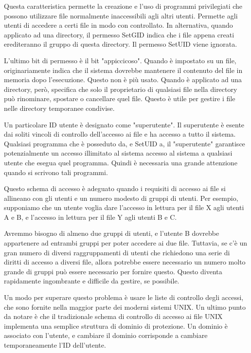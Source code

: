 \singlespacing

Questa caratteristica permette la creazione e l'uso di programmi privilegiati che possono utilizzare file normalmente inaccessibili agli altri utenti. Permette agli utenti di accedere a certi file in modo con controllato. In alternativa, quando applicato ad una directory, il permesso SetGID indica che i file appena creati erediteranno il gruppo di questa directory. Il permesso SetUID viene ignorata.

\singlespacing

L'ultimo bit di permesso è il bit "appiccicoso". Quando è impostato su un file, originariamente indica che il sistema dovrebbe mantenere il contenuto del file in memoria dopo l'esecuzione. Questo non è più usato. Quando è applicato ad una directory, però, specifica che solo il proprietario di qualsiasi file nella directory può rinominare, spostare o cancellare quel file. Questo è utile per gestire i file nelle directory temporanee condivise.

\singlespacing

Un particolare ID utente è designato come "superutente". Il superutente è esente dai soliti vincoli di controllo dell'accesso ai file e ha accesso a tutto il sistema. Qualsiasi programma che è posseduto da, e SetUID a, il "superutente" garantisce potenzialmente un accesso illimitato al sistema accesso al sistema a qualsiasi utente che esegua quel programma. Quindi è necessaria una grande attenzione quando si scrivono tali programmi.

\singlespacing

Questo schema di accesso è adeguato quando i requisiti di accesso ai file si allineano con gli utenti e un numero modesto di gruppi di utenti. Per esempio, supponiamo che un utente voglia dare l'accesso in lettura per il file X agli utenti A e B, e l'accesso in lettura per il file Y agli utenti B e C.

\singlespacing

Avremmo bisogno di almeno due gruppi di utenti, e l'utente B dovrebbe appartenere ad entrambi gruppi per poter accedere ai due file. Tuttavia, se c'è un gran numero di diversi raggruppamenti di utenti che richiedono una serie di diritti di accesso a diversi file, allora potrebbe essere necessario un numero molto grande di gruppi può essere necessario per fornire questo. Questo diventa rapidamente ingombrante e difficile da gestire, se possibile.

\singlespacing

Un modo per superare questo problema è usare le liste di controllo degli accessi, che sono fornite nella maggior parte dei moderni sistemi UNIX. Un ultimo punto da notare è che il tradizionale schema di controllo di accesso ai file UNIX implementa una semplice struttura di dominio di protezione. Un dominio è associato con l'utente, e cambiare il dominio corrisponde a cambiare temporaneamente l'ID dell'utente.

